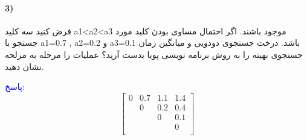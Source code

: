 \documentclass[10pt,a4paper]{article}
\begin{document}
	\paragraph{3)} فرض کنید سه کلید a1<a2<a3 موجود باشند. اگر احتمال مساوی بودن کلید مورد جستجو با a1=0.7 , a2=0.2 و a3=0.1 باشد. درخت جستجوی دودویی و میانگین زمان جستجوی بهینه را به روش برنامه نویسی پویا بدست آرید؟ عملیات را مرحله به مرلحه نشان دهید.
	\begin{flushright} 
		\textcolor{blue}{پاسخ:}
		$$
		\begin{bmatrix}
			0 & 0.7 & 1.1 & 1.4  \\
			  & 0   & 0.2 & 0.4  \\
			  &     & 0 & 0.1    \\
			  &     &   & 0      \\
		\end{bmatrix}
		$$
	\end{flushright}
\end{document}
